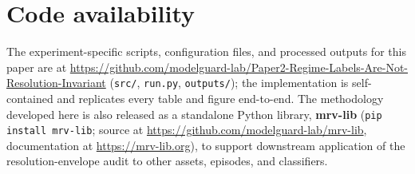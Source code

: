 \documentclass[preprint,12pt,authoryear]{elsarticle}
\begin{document}
\section*{Code availability}

The experiment-specific scripts, configuration files, and processed outputs for this paper are at \url{https://github.com/modelguard-lab/Paper2-Regime-Labels-Are-Not-Resolution-Invariant} (\texttt{src/}, \texttt{run.py}, \texttt{outputs/}); the implementation is self-contained and replicates every table and figure end-to-end. The methodology developed here is also released as a standalone Python library, \textbf{mrv-lib} (\texttt{pip install mrv-lib}; source at \url{https://github.com/modelguard-lab/mrv-lib}, documentation at \url{https://mrv-lib.org}), to support downstream application of the resolution-envelope audit to other assets, episodes, and classifiers.



\end{document}
